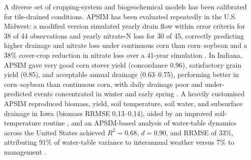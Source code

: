 \documentclass[11pt]{article}
\begin{document}
A diverse set of cropping-system and biogeochemical models has been calibrated for tile-drained conditions. APSIM has been evaluated repeatedly in the U.S. Midwest: a modified version simulated yearly drain flow within error criteria for 38 of 44 observations and yearly nitrate-N loss for 30 of 45, correctly predicting higher drainage and nitrate loss under continuous corn than corn--soybean and a 38\% cover-crop reduction in nitrate loss over a 41-year simulation \parencite{Malone2007c}. In Indiana, APSIM gave very good corn stover yield (concordance 0.96), satisfactory grain yield (0.85), and acceptable annual drainage (0.63--0.75), performing better in corn--soybean than continuous corn, with daily drainage poor and under-predicted events concentrated in winter and early spring \parencite{Ojeda2018}. A heavily customised APSIM reproduced biomass, yield, soil temperature, soil water, and subsurface drainage in Iowa (biomass RRMSE 0.13--0.14), aided by an improved soil-temperature routine \parencite{Dietzel2016}, and an APSIM-based analysis of water-table dynamics across the United States achieved $R^2 = 0.68$, $d = 0.90$, and RRMSE of 33\%, attributing 91\% of water-table variance to interannual weather versus 7\% to management \parencite{Elli2023}.
\end{document}
